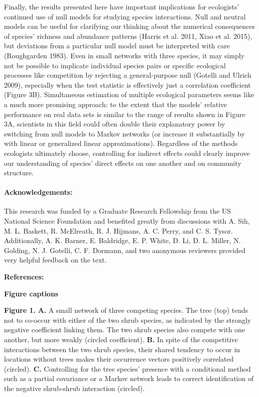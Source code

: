 \documentclass[12pt,]{article}
\begin{document}
\begin{spacing}{1.9}
\begin{flushleft}
Finally, the results presented here have important implications for
ecologists' continued use of null models for studying species
interactions. Null and neutral models can be useful for clarifying our
thinking about the numerical consequences of species' richness and
abundance patterns (Harris et al. 2011, Xiao et al. 2015), but
deviations from a particular null model must be interpreted with care
(Roughgarden 1983). Even in small networks with three species, it may
simply not be possible to implicate individual species pairs or specific
ecological processes like competition by rejecting a general-purpose
null (Gotelli and Ulrich 2009), especially when the test statistic is
effectively just a correlation coefficient (Figure 3B). Simultaneous
estimation of multiple ecological parameters seems like a much more
promising approach: to the extent that the models' relative performance
on real data sets is similar to the range of results shown in Figure 3A,
scientists in this field could often double their explanatory power by
switching from null models to Markov networks (or increase it
substantially by with linear or generalized linear approximations).
Regardless of the methods ecologists ultimately choose, controlling for
indirect effects could clearly improve our understanding of species'
direct effects on one another and on community structure.

\paragraph{Acknowledgements:}\label{acknowledgements}

This research was funded by a Graduate Research Fellowship from the US
National Science Foundation and benefited greatly from discussions with
A. Sih, M. L. Baskett, R. McElreath, R. J. Hijmans, A. C. Perry, and C.
S. Tysor. Additionally, A. K. Barner, E. Baldridge, E. P. White, D. Li,
D. L. Miller, N. Golding, N. J. Gotelli, C. F. Dormann, and two
anonymous reviewers provided very helpful feedback on the text.

\setlength{\parindent}{0cm}

\textbf{References:}

\textbf{Figure captions}

\textbf{Figure 1.} \textbf{A.} A small network of three competing
species. The tree (top) tends not to co-occur with either of the two
shrub species, as indicated by the strongly negative coefficient linking
them. The two shrub species also compete with one another, but more
weakly (circled coefficient). \textbf{B.} In spite of the competitive
interactions between the two shrub species, their shared tendency to
occur in locations without trees makes their occurrence vectors
positively correlated (circled). \textbf{C.} Controlling for the tree
species' presence with a conditional method such as a partial covariance
or a Markov network leads to correct identification of the negative
shrub-shrub interaction (circled).


\end{flushleft}
\end{spacing}
\end{document}
